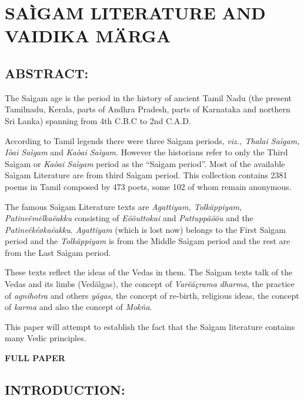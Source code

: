 
\chapter{SAÌGAM LITERATURE AND VAIDIKA MÄRGA}



\section*{ABSTRACT:}

The Saìgam age is the period in the history of ancient Tamil Nadu (the present Tamilnadu, Kerala, parts of Andhra Pradesh, parts of Karnataka and northern Sri Lanka) spanning from 4th C.B.C to 2nd C.A.D.

According to Tamil legends there were three Saìgam periods, \textit{viz., Thalai Saìgam, Iòai Saìgam} and \textit{Kaòai Saìgam}. However the historians refer to only the Third Saìgam or \textit{Kaòai Saìgam} period as the “Saìgam period”. Most of the available Saìgam Literature are from third Saìgam period. This collection contains 2381 poems in Tamil composed by 473 poets, some 102 of whom remain anonymous.

The famous Saìgam Literature texts are \textit{Agattiyam, Tolkäppiyam, Patineëmēlkaëakku} consisting of \textit{Eööuttokai} and \textit{Pattuppäööu} and the \textit{Patineëkéøkaëakku}. \textit{Agattiyam} (which is lost now) belongs to the First Saìgam period and the \textit{Tolkäppiyam} is from the Middle Saìgam period and the rest are from the Last Saìgam period.

These texts reflect the ideas of the Vedas in them. The Saìgam texts talk of the Vedas and its limbs (Vedäìgas), the concept of \textit{Varëäçrama dharma}, the practice of \textit{agnihotra} and others \textit{yägas}, the concept of re-birth, religious ideas, the concept of \textit{karma} and also the concept of \textit{Mokña}.

This paper will attempt to establish the fact that the Saìgam literature contains many Vedic principles.

\begin{center}
\textbf{FULL PAPER}
\end{center}


\section*{INTRODUCTION:}

